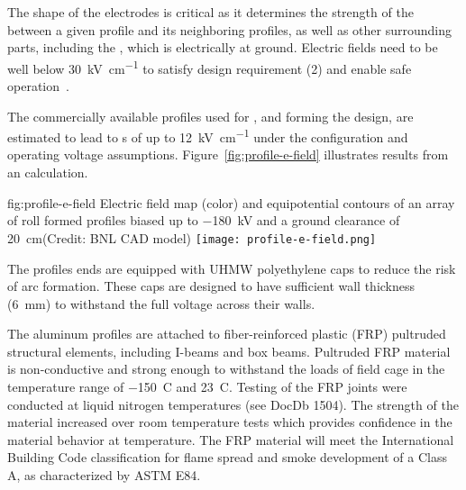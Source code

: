 The shape of the electrodes is critical as it determines the strength of the \efield{} between a given profile and its neighboring profiles, as well as
other surrounding parts, including the , which is electrically at ground. %
Electric fields need to be well below \SI{30}{\kilo\volt\per\centi\meter} 
to satisfy design requirement (2) and enable safe  operation~\cite{Blatter:2014wua}. %

The commercially available profiles used for , and forming the  design, are estimated to lead to \efield{}s of up to \SI{12}{\kilo\volt\per\centi\meter} under the %
configuration and operating voltage assumptions.
Figure~\ref{fig:profile-e-field} illustrates results from an \efield{} calculation.
\begin{dunefigure}
{fig:profile-e-field}
{Electric field map (color) and equipotential contours of an array of roll formed profiles biased up to \SI{-180}{\kV} and a ground clearance of \SI{20}{\cm}(Credit: BNL CAD model)} \texttt{[image: profile-e-field.png]}
\end{dunefigure}

The profiles ends are equipped with UHMW polyethylene caps to reduce the risk of arc formation.  These caps are designed to have sufficient wall thickness (\SI{6}{\milli\m}) to withstand the full voltage across their walls.

The aluminum profiles are attached to fiber-reinforced plastic (FRP) pultruded structural elements, including I-beams and box beams.  
Pultruded FRP material is non-conductive and strong enough to withstand the loads of field cage in the temperature range of \SI{-150}{C} and \SI{23}{C}. Testing of the FRP joints were conducted at liquid nitrogen temperatures (see DocDb 1504).  The strength of the material increased over room temperature tests which provides confidence in the material behavior at \lar  temperature.
The FRP material will meet the International Building Code classification for flame spread and smoke development of a Class A, as characterized by ASTM E84.  

